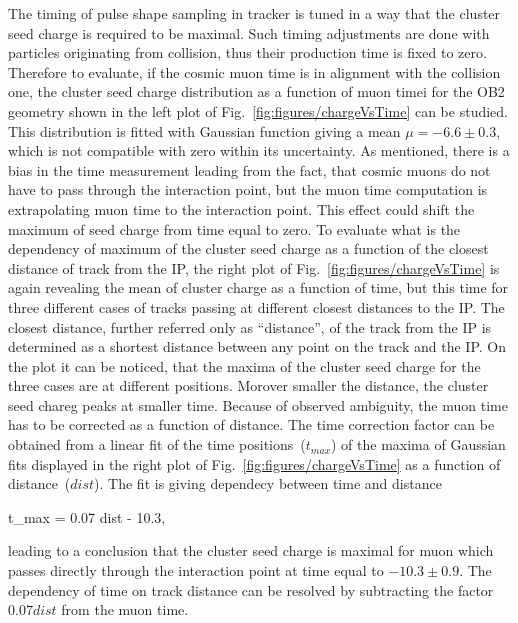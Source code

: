 The timing of pulse shape sampling in tracker is tuned in a way that the cluster seed charge is required to be maximal. Such timing adjustments are done with particles originating from collision, thus their production time is fixed to zero. Therefore to evaluate, if the cosmic muon time is in alignment with the collision one, the cluster seed charge distribution as a function of muon timei for the OB2 geometry shown in the left plot of Fig.~\ref{fig:figures/chargeVsTime} can be studied. This distribution is fitted with Gaussian function giving a mean $\mu = -6.6 \pm 0.3$, which is not compatible with zero within its uncertainty. As mentioned, there is a bias in the time measurement leading from the fact, that cosmic muons do not have to pass through the interaction point, but the muon time computation is extrapolating muon time to the interaction point. This effect could shift the maximum of seed charge from time equal to zero. To evaluate what is the dependency of maximum of the cluster seed charge as a function of the closest distance of track from the IP, the right plot of Fig.~\ref{fig:figures/chargeVsTime} is again revealing the mean of cluster charge as a function of time, but this time for three different cases of tracks passing at different closest distances to the IP. The closest distance, further referred only as ``distance'', of the track from the IP  is determined as a shortest distance between any point on the track and the IP. On the plot it can be noticed, that the maxima of the cluster seed charge for the three cases are at different positions. Morover smaller the distance, the cluster seed chareg peaks at smaller time. Because of observed ambiguity, the muon time has to be corrected as a function of distance. The time correction factor can be obtained from a linear fit of the time positions~($t_{max}$) of the maxima of Gaussian fits displayed in the right plot of Fig.~\ref{fig:figures/chargeVsTime} as a function of distance~($dist$). The fit is giving dependecy between time and distance

{
t_{max} = 0.07 dist  - 10.3,
}

leading to a conclusion that the cluster seed charge is maximal for muon which passes directly through the interaction point at time equal to $-10.3 \pm 0.9 $. The dependency of time on track distance can be resolved by subtracting the factor $ 0.07 dist $ from the muon time.




